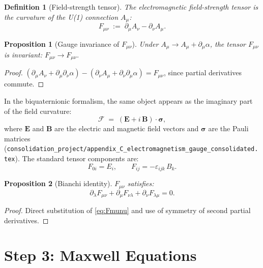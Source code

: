 \documentclass[11pt,a4paper]{article}
\newtheorem{proposition}{Proposition}
\newtheorem{definition}{Definition}
\begin{document}
\medskip

\begin{definition}[Field-strength tensor]
The electromagnetic field-strength tensor is the curvature of the U(1)
connection $A_\mu$:
\begin{equation}\label{eq:Fmunu}
  F_{\mu\nu} \;:=\; \partial_\mu A_\nu - \partial_\nu A_\mu.
\end{equation}
\end{definition}

\begin{proposition}[Gauge invariance of $F_{\mu\nu}$]
Under $A_\mu \to A_\mu + \partial_\mu\alpha$, the tensor $F_{\mu\nu}$ is invariant:
$F_{\mu\nu} \to F_{\mu\nu}$.
\end{proposition}
\begin{proof}
$(\partial_\mu A_\nu + \partial_\mu\partial_\nu\alpha)
- (\partial_\nu A_\mu + \partial_\nu\partial_\mu\alpha)
= F_{\mu\nu}$, since partial derivatives commute.
\end{proof}

In the biquaternionic formalism, the same object appears as the imaginary part
of the field curvature:
\begin{equation}
  \mathcal{F} \;=\; (\mathbf{E} + i\,\mathbf{B})\cdot\boldsymbol{\sigma},
\end{equation}
where $\mathbf{E}$ and $\mathbf{B}$ are the electric and magnetic field vectors
and $\boldsymbol{\sigma}$ are the Pauli matrices
(\texttt{consolidation\_project/appendix\_C\_electromagnetism\_gauge\_consolidated.tex}).
The standard tensor components are:
\begin{equation}
  F_{0i} = E_i, \qquad F_{ij} = -\varepsilon_{ijk}\,B_k.
\end{equation}

\begin{proposition}[Bianchi identity]
\label{prop:bianchi}
$F_{\mu\nu}$ satisfies:
\begin{equation}\label{eq:bianchi}
  \partial_\lambda F_{\mu\nu} + \partial_\mu F_{\nu\lambda}
  + \partial_\nu F_{\lambda\mu} = 0.
\end{equation}
\end{proposition}
\begin{proof}
Direct substitution of \eqref{eq:Fmunu} and use of symmetry of second
partial derivatives.
\end{proof}

\section{Step 3: Maxwell Equations}
\end{document}
